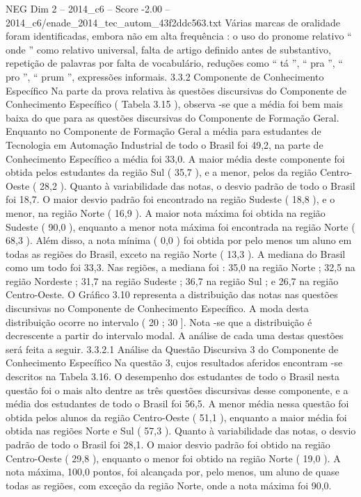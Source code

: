 \begin{textsample}{NEG Dim 2 – 2014\_c6 – Score -2.00 – 2014\_c6/enade\_2014\_tec\_autom\_43f2ddc563.txt}
Várias marcas de oralidade foram identificadas, embora não em alta frequência : o uso do pronome relativo “ onde ” como relativo universal, falta de artigo definido antes de substantivo, repetição de palavras por falta de vocabulário, reduções como “ tá ”, “ pra ”, “ pro ”, “ prum ”, expressões informais. 3.3.2 Componente de Conhecimento Específico Na parte da prova relativa às questões discursivas do Componente de Conhecimento Específico ( Tabela 3.15 ), observa -se que a média foi bem mais baixa do que para as questões discursivas do Componente de Formação Geral.
Enquanto no Componente de Formação Geral a média para estudantes de Tecnologia em Automação Industrial de todo o Brasil foi 49,2, na parte de Conhecimento Específico a média foi 33,0.
A maior média deste componente foi obtida pelos estudantes da região Sul ( 35,7 ), e a menor, pelos da região Centro-Oeste ( 28,2 ).
Quanto à variabilidade das notas, o desvio padrão de todo o Brasil foi 18,7.
O maior desvio padrão foi encontrado na região Sudeste ( 18,8 ), e o menor, na região Norte ( 16,9 ).
A maior nota máxima foi obtida na região Sudeste ( 90,0 ), enquanto a menor nota máxima foi encontrada na região Norte ( 68,3 ).
Além disso, a nota mínima ( 0,0 ) foi obtida por pelo menos um aluno em todas as regiões do Brasil, exceto na região Norte ( 13,3 ).
A mediana do Brasil como um todo foi 33,3.
Nas regiões, a mediana foi : 35,0 na região Norte ; 32,5 na região Nordeste ; 31,7 na região Sudeste ; 36,7 na região Sul ; e 26,7 na região Centro-Oeste.
O Gráfico 3.10 representa a distribuição das notas nas questões discursivas no Componente de Conhecimento Específico.
A moda desta distribuição ocorre no intervalo ( 20 ; 30 ].
Nota -se que a distribuição é decrescente a partir do intervalo modal.
A análise de cada uma destas questões será feita a seguir. 3.3.2.1 Análise da Questão Discursiva 3 do Componente de Conhecimento Específico Na questão 3, cujos resultados aferidos encontram -se descritos na Tabela 3.16.
O desempenho dos estudantes de todo o Brasil nesta questão foi o mais alto dentre as três questões discursivas desse componente, e a média dos estudantes de todo o Brasil foi 56,5.
A menor média nessa questão foi obtida pelos alunos da região Centro-Oeste ( 51,1 ), enquanto a maior média foi obtida nas regiões Norte e Sul ( 57,3 ).
Quanto à variabilidade das notas, o desvio padrão de todo o Brasil foi 28,1.
O maior desvio padrão foi obtido na região Centro-Oeste ( 29,8 ), enquanto o menor foi obtido na região Norte ( 19,0 ).
A nota máxima, 100,0 pontos, foi alcançada por, pelo menos, um aluno de quase todas as regiões, com exceção da região Norte, onde a nota máxima foi 90,0.

\end{textsample}
